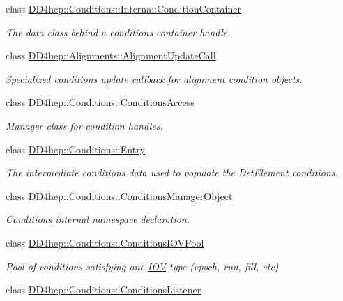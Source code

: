 \begin{DoxyCompactItemize}
class \hyperlink{class_d_d4hep_1_1_conditions_1_1_interna_1_1_condition_container}{D\+D4hep\+::\+Conditions\+::\+Interna\+::\+Condition\+Container}
\begin{DoxyCompactList}\small\item\em The data class behind a conditions container handle. \end{DoxyCompactList}\item 
class \hyperlink{class_d_d4hep_1_1_alignments_1_1_alignment_update_call}{D\+D4hep\+::\+Alignments\+::\+Alignment\+Update\+Call}
\begin{DoxyCompactList}\small\item\em Specialized conditions update callback for alignment condition objects. \end{DoxyCompactList}\item 
class \hyperlink{class_d_d4hep_1_1_conditions_1_1_conditions_access}{D\+D4hep\+::\+Conditions\+::\+Conditions\+Access}
\begin{DoxyCompactList}\small\item\em Manager class for condition handles. \end{DoxyCompactList}\item 
class \hyperlink{class_d_d4hep_1_1_conditions_1_1_entry}{D\+D4hep\+::\+Conditions\+::\+Entry}
\begin{DoxyCompactList}\small\item\em The intermediate conditions data used to populate the Det\+Element conditions. \end{DoxyCompactList}\item 
class \hyperlink{class_d_d4hep_1_1_conditions_1_1_conditions_manager_object}{D\+D4hep\+::\+Conditions\+::\+Conditions\+Manager\+Object}
\begin{DoxyCompactList}\small\item\em \hyperlink{namespace_d_d4hep_1_1_conditions}{Conditions} internal namespace declaration. \end{DoxyCompactList}\item 
class \hyperlink{class_d_d4hep_1_1_conditions_1_1_conditions_i_o_v_pool}{D\+D4hep\+::\+Conditions\+::\+Conditions\+I\+O\+V\+Pool}
\begin{DoxyCompactList}\small\item\em Pool of conditions satisfying one \hyperlink{class_d_d4hep_1_1_i_o_v}{I\+OV} type (epoch, run, fill, etc) \end{DoxyCompactList}\item 
class \hyperlink{class_d_d4hep_1_1_conditions_1_1_conditions_listener}{D\+D4hep\+::\+Conditions\+::\+Conditions\+Listener}

\end{DoxyCompactItemize}
